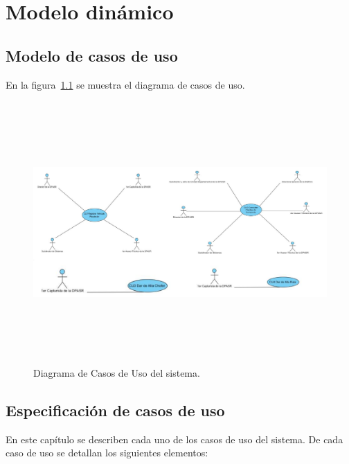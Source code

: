 \chapter{Modelo dinámico}

\section{Modelo de casos de uso}

En la figura~\ref{fig:casosdeuso} se muestra el diagrama de casos de uso.

\begin{figure}[htbp!]
	\centering
	\includegraphics[width=16cm, height=10cm]{images/1}
	\caption{Diagrama de Casos de Uso del sistema.}
	\label{fig:casosdeuso}
\end{figure}


\section{Especificación de casos de uso}

	En este capítulo se describen cada uno de los casos de uso del sistema. De cada caso de uso se detallan los siguientes elementos:\\
	
